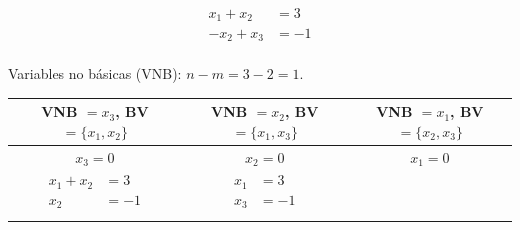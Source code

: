 \documentclass[../main.tex]{subfiles}
\begin{document}
        \begin{example}
            \begin{equation}
                \begin{aligned}
                    x_1 + x_2 &= 3 \\
                    - x_2 + x_3 &= -1 \\
                \end{aligned}
            \end{equation}

            Variables no básicas (VNB): $n-m = 3-2 = 1$.
            \begin{table}[h]
                \begin{center}
                    \begin{tabular}{|c|c|c|}
                        \hline
                        VNB $= {x_3}$, BV $= \{x_1,x_2\}$ & VNB $= {x_2}$, BV $= \{x_1,x_3\}$ & VNB $= {x_1}$, BV $= \{x_2,x_3\}$ \\ \hline
                        $x_3 = 0$ & $x_2 = 0$ & $x_1 = 0$ \\ \hline
                        \begin{minipage}{.3\textwidth}
                            \begin{equation*}
                                \begin{aligned}
                                    x_1 + x_2 &= 3\\
                                    x_2 &= -1 \\
                                \end{aligned}
                            \end{equation*}
                        \end{minipage} & \begin{minipage}{.3\textwidth}
                            \begin{equation*}
                                \begin{aligned}
                                    x_1 &= 3\\
                                    x_3 &= -1 \\
                                \end{aligned}
                            \end{equation*}
                        \end{minipage} & \begin{minipage}{.3\textwidth}
                            \begin{equation*}

\end{equation*}
\end{minipage}
\end{tabular}
\end{center}
\end{table}
\end{example}
\end{document}
